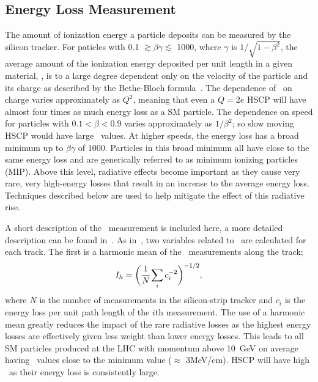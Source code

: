 \subsection{Energy Loss Measurement \label{sec:DedxMeasurement}}
The amount of ionization energy a particle deposits can be measured by the silicon tracker.
For paticles with 0.1 $\gtrsim \beta \gamma \lesssim$ 1000, where $\gamma$ is $1/\sqrt{1 - \beta^2}$,
the average amount of the ionization energy deposited per unit length in a given material, \dedx, is to a large degree dependent only on the velocity of the particle
and its charge as described by the Bethe-Bloch formula~\cite{PDG}.
The dependence of \dedx\  on charge varies approximately as $Q^2$, meaning that even a $Q=2e$ HSCP will have almost four times as much energy loss as a SM particle. 
The dependence on speed for particles with $0.1 < \beta < 0.9$ varies approximately as $1/\beta^2$; so slow moving HSCP would have large \dedx\ values.
At higher speeds, the energy loss has a broad minimum up to $\beta \gamma$ of 1000.
Particles in this broad minimum all have close to the same energy loss and are generically referred to as minimum ionizing particles (MIP).
Above this level, radiative effects become important as they cause very rare, very high-energy losses that result in an increase to the average energy loss.
Techniques described below are used to help mitigate the effect of this radiative rise.

A short description of the \dedx\ measurement is included here, a more detailed description can be found in~\cite{2010EPJC...70.1165K, Khachatryan:2011ts, Quertenmont:1361029}.
As in~\cite{Chatrchyan:2012sp}, two variables related to \dedx\ are calculated for each track. 
The first is a harmonic mean of the \dedx\ measurements along the track;
\begin{equation}
 I_h= \biggl( \cfrac{1}{N} \sum_i c_{i}^{-2} \biggr)^{-1/2},
 \label{eq:HarmonicEstimator}
\end{equation}
where $N$ is the number of measurements in the silicon-strip tracker and $c_{i}$ is the energy loss per unit path length
of the $i$th measurement. The use of a harmonic mean greatly reduces the impact of the rare radiative losses as the highest energy
losses are effectively given less weight than lower energy losses. This leads to all
SM particles produced at the LHC with momentum above 10~GeV on average having \ih\ values close to the minimum value ($\approx$ 3MeV/cm). 
HSCP will have high \ih\ as their energy loss is consistently large.

